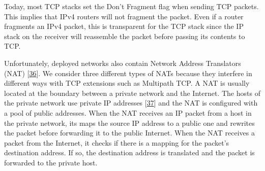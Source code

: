\documentclass[letterpaper,10pt,english]{sphinxmanual}
\begin{document}
\sphinxAtStartPar
Today, most TCP stacks set the Don’t Fragment flag when sending TCP packets. This implies that IPv4 routers will not fragment the packet. Even if a router fragments an IPv4 packet, this is transparent for the TCP stack since the IP stack on the receiver will reassemble the packet before passing its contents to TCP.

\sphinxAtStartPar
Unfortunately, deployed networks also contain Network Address Translators (NAT) {[}\hyperlink{cite.biblio:id2952}{36}{]}. We consider three different types of NATs because they interfere in different ways with TCP extensions such as Multipath TCP. A NAT is usually located at the boundary between a private network and the Internet. The hosts of the private network use private IP addresses {[}\hyperlink{cite.biblio:id1848}{37}{]} and the NAT is configured with a pool of public addresses. When the NAT receives an IP packet from a host in the private network, its maps the source IP address to a public one and rewrites the packet before forwarding it to the public Internet. When the NAT receives a packet from the Internet, it checks if there is a mapping for the packet’s destination address. If so, the destination address is translated and the packet is forwarded to the private host.
\end{document}
